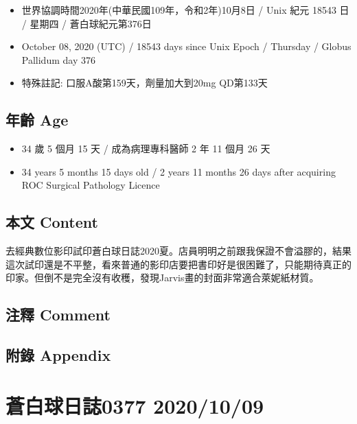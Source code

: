 \documentclass[
]{article}
\providecommand{\tightlist}{%
  \setlength{\itemsep}{0pt}\setlength{\parskip}{0pt}}
\begin{document}
\begin{itemize}
\tightlist
\item
  世界協調時間2020年(中華民國109年，令和2年)10月8日 / Unix 紀元 18543 日
  / 星期四 / 蒼白球紀元第376日
\item
  October 08, 2020 (UTC) / 18543 days since Unix Epoch / Thursday /
  Globus Pallidum day 376
\item
  特殊註記: 口服A酸第159天，劑量加大到20mg QD第133天
\end{itemize}

\hypertarget{ux5e74ux9f61-age-7}{%
\subsection{年齡 Age}\label{ux5e74ux9f61-age-7}}

\begin{itemize}
\tightlist
\item
  34 歲 5 個月 15 天 / 成為病理專科醫師 2 年 11 個月 26 天
\item
  34 years 5 months 15 days old / 2 years 11 months 26 days after
  acquiring ROC Surgical Pathology Licence
\end{itemize}

\hypertarget{ux672cux6587-content-7}{%
\subsection{本文 Content}\label{ux672cux6587-content-7}}

去經典數位影印試印蒼白球日誌2020夏。店員明明之前跟我保證不會溢膠的，結果這次試印還是不平整，看來普通的影印店要把書印好是很困難了，只能期待真正的印家。但倒不是完全沒有收穫，發現Jarvis畫的封面非常適合萊妮紙材質。

\hypertarget{ux6ce8ux91cb-comment-7}{%
\subsection{注釋 Comment}\label{ux6ce8ux91cb-comment-7}}

\hypertarget{ux9644ux9304-appendix-7}{%
\subsection{附錄 Appendix}\label{ux9644ux9304-appendix-7}}

\hypertarget{ux84bcux767dux7403ux65e5ux8a8c0377-20201009}{%
\section{蒼白球日誌0377
2020/10/09}\label{ux84bcux767dux7403ux65e5ux8a8c0377-20201009}}
\end{document}

